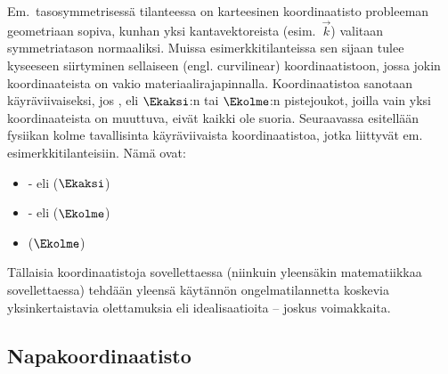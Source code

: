 Em.\ tasosymmetrisessä tilanteessa on karteesinen koordinaatisto probleeman 
geometriaan sopiva, kunhan yksi kantavektoreista (esim.\ $\vec k$) valitaan symmetriatason
normaaliksi. Muissa esimerkkitilanteissa sen sijaan tulee kyseeseen siirtyminen sellaiseen 
 (engl. curvilinear) koordinaatistoon, jossa jokin koordinaateista on vakio 
materiaalirajapinnalla. Koordinaatistoa sanotaan käyräviivaiseksi, jos
%
,
eli $\Ekaksi$:n tai $\Ekolme$:n pistejoukot, joilla vain yksi koordinaateista on muuttuva, eivät
kaikki ole suoria. Seuraavassa esitellään fysiikan kolme tavallisinta käyräviivaista 
koordinaatistoa, jotka liittyvät em. esimerkkitilanteisiin. Nämä ovat:
%
%
\begin{itemize}
\item  {}- eli  ($\Ekaksi$)
\item  {}- eli  ($\Ekolme$)
\item  {} ($\Ekolme$)
\end{itemize}
Tällaisia koordinaatistoja sovellettaessa (niinkuin yleensäkin matematiikkaa sovellettaessa) 
tehdään yleensä käytännön ongelmatilannetta koskevia yksinkertaistavia olettamuksia eli 
idealisaatioita -- joskus voimakkaita.

\subsection{Napakoordinaatisto}


